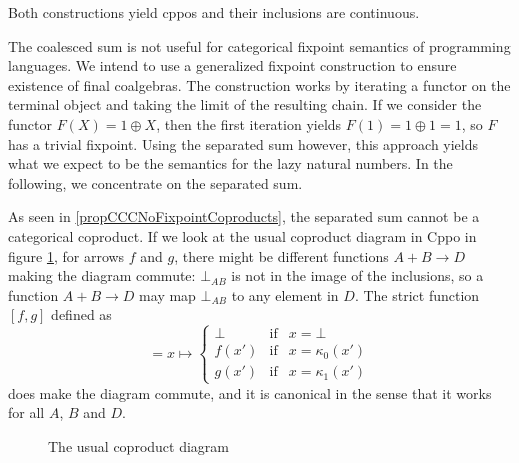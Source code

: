 \documentclass[a4paper]{article}
\newcommand{\arr}{\rightarrow}
\begin{document}
Both constructions yield cppos and their inclusions are continuous.

The coalesced sum is not useful for categorical fixpoint semantics of
programming languages. We intend to use a generalized fixpoint construction to
ensure existence of final coalgebras. The construction works by iterating a
functor on the terminal object and taking the limit of the resulting chain. If
we consider the functor $F(X) = 1 \oplus X$,
then the first iteration yields $F(1) = 1 \oplus 1 = 1$, so $F$ has a trivial
fixpoint. Using the separated sum however, this approach yields what we expect
to be the semantics for the lazy natural numbers. In the following, we
concentrate on the separated sum.

As seen in \ref{propCCCNoFixpointCoproducts}, the separated sum cannot be a
categorical coproduct. If we look at the usual coproduct diagram in Cppo in
figure \ref{figCoproductDiagram}, for arrows $f$ and $g$,
there might be different functions $A+B \arr D$ making the diagram commute:
$\bot_{AB}$ is not in the image of the inclusions, so a function $A+B \arr D$
may map $\bot_{AB}$ to any element in $D$.  The strict function $[f\!,g]$
defined as
\begin{equation*}
[f\!,g] = x \mapsto \left\{
  \begin{array}{lcl}
   \bot   & \text{if} & x = \bot \\
   f(x')  & \text{if} & x = \kappa_0(x') \\
   g(x')  & \text{if} & x = \kappa_1(x')
  \end{array}
\right.
\end{equation*}
does make the diagram commute, and it is canonical in the sense that it
works for all $A$, $B$ and $D$.

\begin{figure}[ht]
\begin{center}
\end{center}
\caption{The usual coproduct diagram} \label{figCoproductDiagram}
\end{figure}
\end{document}
